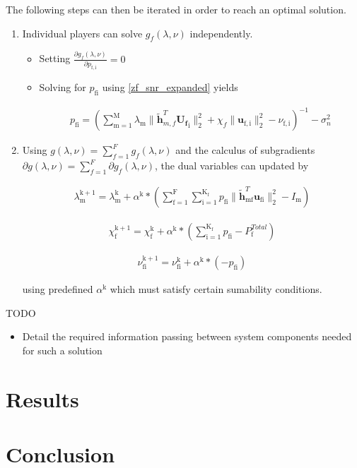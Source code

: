 \documentclass[12pt,a4paper]{report}
\begin{document}
The following steps can then be iterated in order to reach an optimal solution. 
\begin{enumerate}
\item 
Individual players can solve $ g_f(\lambda,\nu) $ independently.
\begin{itemize}
\item Setting $\frac{\partial g_f(\lambda,\nu)}{\partial p_{\mathrm{f,i}}} = 0$ 

\item 
Solving for $p_{\mathrm{fi}}$ using \eqref{zf_snr_expanded} yields

\begin{gather}
p_{\mathrm{fi}} = (\sum_{\mathrm{m=1}}^{\mathrm{M}}\lambda_{\mathrm{m}}\|\mathbf{\tilde{h}}_{m,f}^T \mathbf{U_f}_{\mathrm{i}}\|^2_2
+\chi_{f} \|\mathbf{u}_{\mathrm{f,i}}\|^2_2
-\nu_{\mathrm{f,i}}
 )^{-1}
  - \sigma^2_n
\end{gather}

\end{itemize}
\item 
Using $g(\lambda,\nu) = \sum_{f=1}^{F}g_f(\lambda,\nu)$ and the calculus of subgradients $\partial g(\lambda,\nu) = \sum_{f=1}^{F} \partial g_f(\lambda,\nu)$, the dual variables can updated by 

\begin{gather}
\lambda_{\mathrm{m}}^{\mathrm{k+1}} = 
\lambda_{\mathrm{m}}^{\mathrm{k}}
+
\alpha^{\mathrm{k}}*
(
\sum _{\mathrm{f=1}}^{\mathrm{F}}
\sum _{\mathrm{i=1}}^{\mathrm{K_{\mathrm{f}}}}
p_{\mathrm{fi}}
\|\mathbf{\tilde{h}}_{\mathrm{mf}}^T \mathbf{u_{\mathrm{fi}}}\|^2_2 
- I_{\mathrm{m}}
)
\end{gather}


\begin{gather}
\chi_{\mathrm{f}}^{\mathrm{k+1}} = 
\chi_{\mathrm{f}}^{\mathrm{k}}
+
\alpha^{\mathrm{k}}*
(\sum_{\mathrm{i=1}}^{\mathrm{K_{\mathrm{f}}}} p_{\mathrm{fi}} - P_{\mathrm{f}}^{Total}) 
\end{gather}

\begin{gather}
\nu_{\mathrm{fi}}^{\mathrm{k+1}} = 
\nu_{\mathrm{fi}}^{\mathrm{k}}
+
\alpha^{\mathrm{k}}*
(-p_{\mathrm{fi}})
\end{gather}

using predefined $\alpha^{\mathrm{k}}$ which must satisfy certain sumability conditions.



\end{enumerate} 

TODO 
\begin{itemize}
\item Detail the required information passing between system components needed for such a solution
\end{itemize}

\chapter{Results}

\chapter{Conclusion}

\newpage

\end{document}
